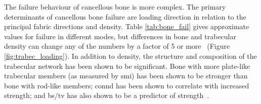 
The failure behaviour of cancellous bone is more complex.
The primary determinants of cancellous bone failure are loading direction in relation to the principal fabric directions and density.
Table \ref{tab:bone_fail} gives approximate values for failure in different modes, but differences in bone and trabecular density can change any of the numbers by a factor of 5 or more~\citep{odgaard_fabric_1997, goulet_relationship_1994, carter_compressive_1977} (Figure \ref{fig:trabec_loading}).
In addition to density, the structure and composition of the trabecular network has been shown to be significant.
Bone with more plate-like trabecular members (as measured by \ac{smi}) has been shown to be stronger than bone with rod-like members; \ac{connd} has been shown to correlate with increased strength; and \ac{bs/tv} has also shown to be a predictor of strength~\citep{nazarian_interaction_2006}.

